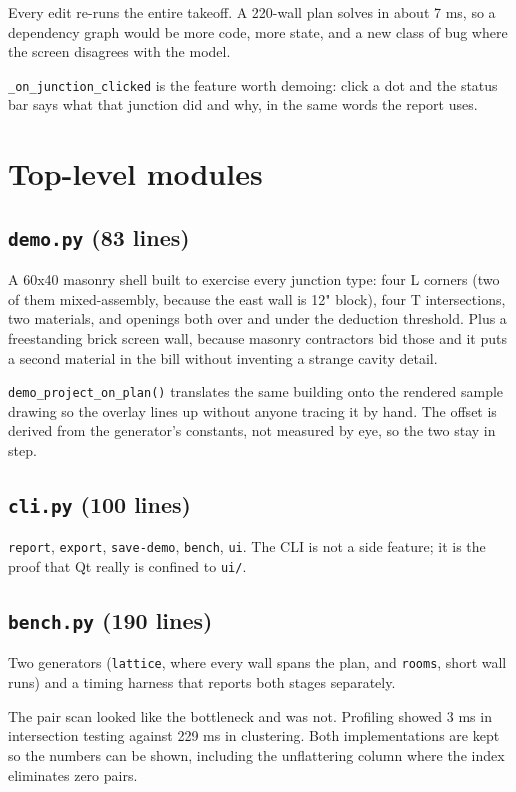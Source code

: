 \documentclass[11pt,letterpaper]{article}
\newcommand{\code}[1]{\texttt{\small #1}}
\begin{document}
Every edit re-runs the entire takeoff. A 220-wall plan solves in about 7 ms,
so a dependency graph would be more code, more state, and a new class of bug
where the screen disagrees with the model.

\code{\_on\_junction\_clicked} is the feature worth demoing: click a dot and
the status bar says what that junction did and why, in the same words the
report uses.

\section{Top-level modules}

\subsection{\texttt{demo.py} (83 lines)}

A 60x40 masonry shell built to exercise every junction type: four L corners
(two of them mixed-assembly, because the east wall is 12" block), four T
intersections, two materials, and openings both over and under the deduction
threshold. Plus a freestanding brick screen wall, because masonry
contractors bid those and it puts a second material in the bill without
inventing a strange cavity detail.

\code{demo\_project\_on\_plan()} translates the same building onto the
rendered sample drawing so the overlay lines up without anyone tracing it by
hand. The offset is derived from the generator's constants, not measured by
eye, so the two stay in step.

\subsection{\texttt{cli.py} (100 lines)}

\code{report}, \code{export}, \code{save-demo}, \code{bench}, \code{ui}. The
CLI is not a side feature; it is the proof that Qt really is confined to
\code{ui/}.

\subsection{\texttt{bench.py} (190 lines)}

Two generators (\code{lattice}, where every wall spans the plan, and
\code{rooms}, short wall runs) and a timing harness that reports both stages
separately.

\begin{keypoint}
The pair scan looked like the bottleneck and was not. Profiling showed 3 ms
in intersection testing against 229 ms in clustering. Both implementations
are kept so the numbers can be shown, including the unflattering column
where the index eliminates zero pairs.
\end{keypoint}
\end{document}
